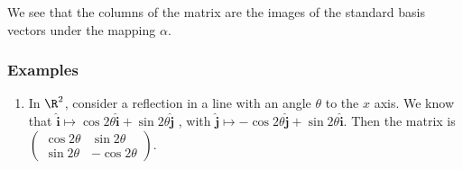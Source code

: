 \documentclass[a4paper]{article}
\begin{document}
We see that the columns of the matrix are the images of the standard basis vectors under the mapping $\alpha$.

\begin{eg}
\end{eg}


\subsubsection{Examples}
\begin{enumerate}
  \item In $\R^2$, consider a reflection in a line with an angle $\theta$ to the $x$ axis. We know that $\mathbf{\hat{i}}\mapsto \cos 2\theta \mathbf{\hat{i}} + \sin 2\theta\mathbf{\hat j}$ , with $\mathbf{\hat{j}}\mapsto -\cos 2\theta \mathbf{\hat{j}} + \sin 2\theta\mathbf{\hat i}$. Then the matrix is
  $\begin{pmatrix}
    \cos 2\theta & \sin 2\theta\\
    \sin 2\theta & -\cos 2\theta
  \end{pmatrix}$.


\end{enumerate}
\end{document}

